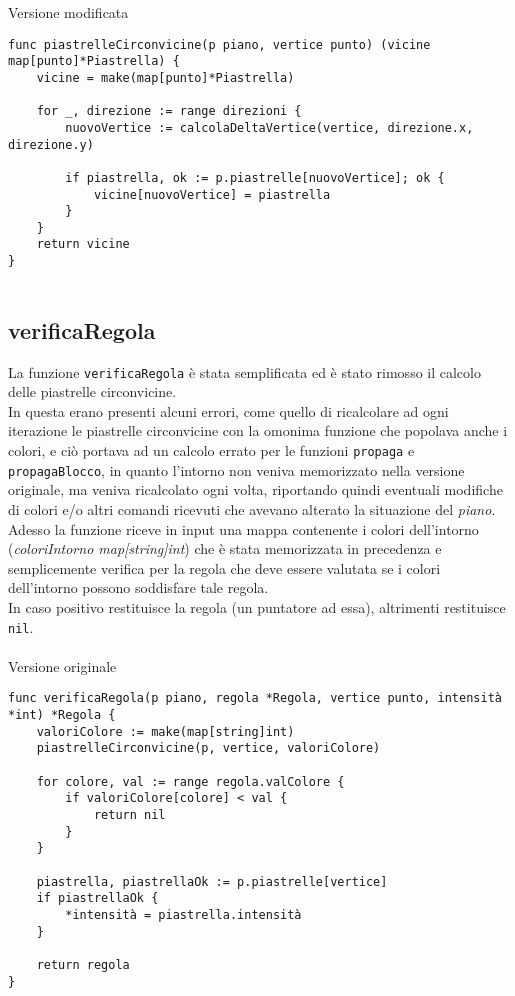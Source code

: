 \documentclass{article}
\begin{document}
Versione modificata
\begin{verbatim}
func piastrelleCirconvicine(p piano, vertice punto) (vicine map[punto]*Piastrella) {
	vicine = make(map[punto]*Piastrella)

	for _, direzione := range direzioni {
		nuovoVertice := calcolaDeltaVertice(vertice, direzione.x, direzione.y)

		if piastrella, ok := p.piastrelle[nuovoVertice]; ok {
			vicine[nuovoVertice] = piastrella
		}
	}
	return vicine
}
  
\end{verbatim}


\subsection{verificaRegola}\label{subsec:checkRule}
La funzione \texttt{verificaRegola} è stata semplificata ed è stato rimosso il calcolo delle piastrelle circonvicine.\\
In questa erano presenti alcuni errori, come quello di ricalcolare ad ogni iterazione le piastrelle circonvicine con la omonima funzione che popolava anche i colori, e ciò portava ad un calcolo errato per le funzioni \texttt{propaga} e \texttt{propagaBlocco}, in quanto l'intorno non veniva memorizzato nella versione originale, ma veniva ricalcolato ogni volta, riportando quindi eventuali modifiche di colori e/o altri comandi ricevuti che avevano alterato la situazione del \textit{piano}.
\\
Adesso la funzione riceve in input una mappa contenente i colori dell'intorno (\textit{coloriIntorno map[string]int}) che è stata memorizzata in precedenza e semplicemente verifica per la regola che deve essere valutata se i colori dell'intorno possono soddisfare tale regola.\\
In caso positivo restituisce la regola (un puntatore ad essa), altrimenti restituisce \texttt{nil}.
\\ \\
Versione originale
\begin{verbatim}
func verificaRegola(p piano, regola *Regola, vertice punto, intensità *int) *Regola {
	valoriColore := make(map[string]int)
	piastrelleCirconvicine(p, vertice, valoriColore)

	for colore, val := range regola.valColore {
		if valoriColore[colore] < val {
			return nil
		}
	}

	piastrella, piastrellaOk := p.piastrelle[vertice]
	if piastrellaOk {
		*intensità = piastrella.intensità
	}

	return regola
}
\end{verbatim}
\end{document}
